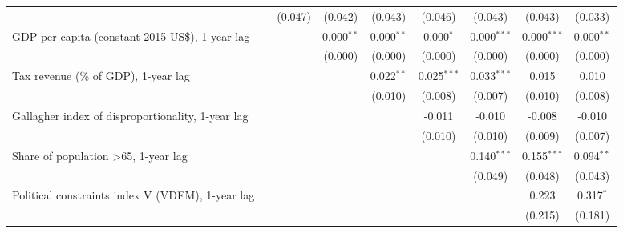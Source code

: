 \begin{table}[htbp]
\begin{tabular}{lcccccccc}
                                                                                            &         & (0.047)      & (0.042)      & (0.043)       & (0.046)       & (0.043)       & (0.043)       & (0.033)\\   
      GDP per capita (constant 2015 US\$), 1-year lag                                       &         &              & 0.000$^{**}$ & 0.000$^{**}$  & 0.000$^{*}$   & 0.000$^{***}$ & 0.000$^{***}$ & 0.000$^{**}$\\   
                                                                                            &         &              & (0.000)      & (0.000)       & (0.000)       & (0.000)       & (0.000)       & (0.000)\\   
      Tax revenue (\% of GDP), 1-year lag                                                   &         &              &              & 0.022$^{**}$  & 0.025$^{***}$ & 0.033$^{***}$ & 0.015         & 0.010\\   
                                                                                            &         &              &              & (0.010)       & (0.008)       & (0.007)       & (0.010)       & (0.008)\\   
      Gallagher index of disproportionality, 1-year lag                                     &         &              &              &               & -0.011        & -0.010        & -0.008        & -0.010\\   
                                                                                            &         &              &              &               & (0.010)       & (0.010)       & (0.009)       & (0.007)\\   
      Share of population >65, 1-year lag                                                   &         &              &              &               &               & 0.140$^{***}$ & 0.155$^{***}$ & 0.094$^{**}$\\   
                                                                                            &         &              &              &               &               & (0.049)       & (0.048)       & (0.043)\\   
      Political constraints index V (VDEM), 1-year lag                                      &         &              &              &               &               &               & 0.223         & 0.317$^{*}$\\   
                                                                                            &         &              &              &               &               &               & (0.215)       & (0.181)\\   

\end{tabular}
\end{table}
